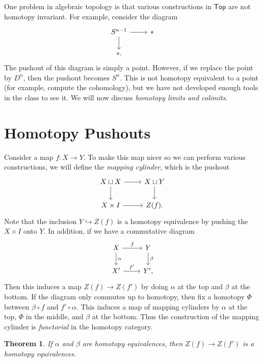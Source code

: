 \documentclass[leqno, openany]{memoir}
\newtheorem{thm}{Theorem}[section]
\theoremstyle{definition}
\theoremstyle{remark}
\theoremstyle{plain}
\theoremstyle{definition}
\theoremstyle{remark}
\newcommand{\ms}[1]{\mathsf{#1}}
\begin{document}
One problem in algebraic topology is that various constructions in $\ms{Top}$ are not homotopy invariant. For example, consider the diagram
\begin{equation}
\begin{tikzcd}
    S^{n-1} \arrow{r} \arrow{d} & * \\
    *.
\end{tikzcd}
\end{equation}
The pushout of this diagram is simply a point. However, if we replace the point by $D^n$, then the pushout becomes $S^n$. This is not homotopy equivalent to a point (for example, compute the cohomology), but we have not developed enough tools in the class to see it. We will now discuss \textit{homotopy limits and colimits}.

\section{Homotopy Pushouts}%
\label{sec:mapping_cylinders}

Consider a map $f: X \to Y$. To make this map nicer so we can perform various constructions, we will define the \textit{mapping cylinder}, which is the pushout
\begin{equation}
\begin{tikzcd}
    X \sqcup X \arrow{r} \arrow{d} & X \sqcup Y \arrow{d} \\
    X \times I \arrow{r} & Z(f).
\end{tikzcd}
\end{equation}
Note that the inclusion $Y \hookrightarrow Z(f)$ is a homotopy equivalence by pushing the $X \times I$ onto $Y$. In addition, if we have a commutative diagram
\begin{equation}
\begin{tikzcd}
    X \arrow{r}{f} \arrow{d}{\alpha} & Y \arrow{d}{\beta} \\
    X' \arrow{r}{f'} & Y',
\end{tikzcd}
\end{equation}
Then this induces a map $Z(f) \to Z(f')$ by doing $\alpha$ at the top and $\beta$ at the bottom. If the diagram only commutes up to homotopy, then fix a homotopy $\Phi$ between $\beta \circ f$ and $f' \circ \alpha$. This induces a map of mapping cylinders by $\alpha$ at the top, $\Phi$ in the middle, and $\beta$ at the bottom. Thus the construction of the mapping cylinder is \textit{functorial} in the homotopy category.

\begin{thm}
    If $\alpha$ and $\beta$ are homotopy equivalences, then $Z(f) \to Z(f')$ is a homotopy equivalences.
\end{thm}
\end{document}
